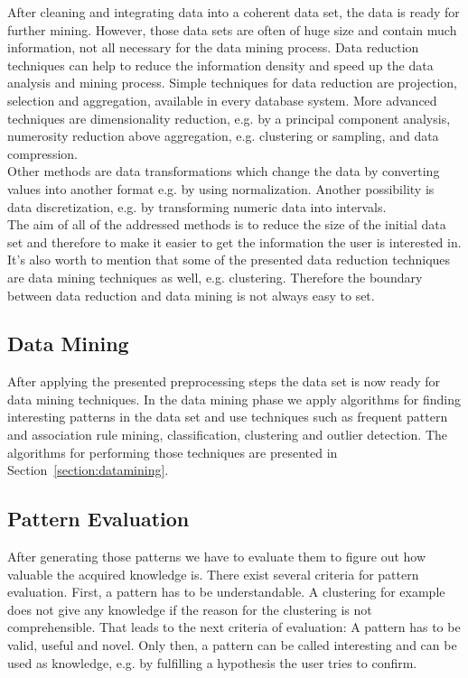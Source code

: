 After cleaning and integrating data into a coherent data set, the data is ready for further mining. However, those data sets are often of huge size and contain much information, not all necessary for the data mining process. Data reduction techniques can help to reduce the information density and speed up the data analysis and mining process. Simple techniques for data reduction are projection, selection and aggregation, available in every database system. More advanced techniques are dimensionality reduction, e.g. by a principal component analysis, numerosity reduction above aggregation, e.g. clustering or sampling, and data compression. 
\\
Other methods are data transformations which change the data by converting values into another format e.g. by using normalization. Another possibility is data discretization, e.g. by transforming numeric data into intervals. 
\\
The aim of all of the addressed methods is to reduce the size of the initial data set and therefore to make it easier to get the information the user is interested in. It's also worth to mention that some of the presented data reduction techniques are data mining techniques as well, e.g. clustering. Therefore the boundary between data reduction and data mining is not always easy to set.


\subsection{Data Mining}

After applying the presented preprocessing steps the data set is now ready for data mining techniques. In the data mining phase we apply algorithms for finding interesting patterns in the data set and use techniques such as frequent pattern and association rule mining, classification, clustering and outlier detection. The algorithms for performing those techniques are presented in Section~\ref{section:datamining}. 


\subsection{Pattern Evaluation}

After generating those patterns we have to evaluate them to figure out how valuable the acquired knowledge is. There exist several criteria for pattern evaluation. First, a pattern has to be understandable. A clustering for example does not give any knowledge if the reason for the clustering is not comprehensible. That leads to the next criteria of evaluation: A pattern has to be valid, useful and novel. Only then, a pattern can be called interesting and can be used as knowledge, e.g. by fulfilling a hypothesis the user tries to confirm. 


